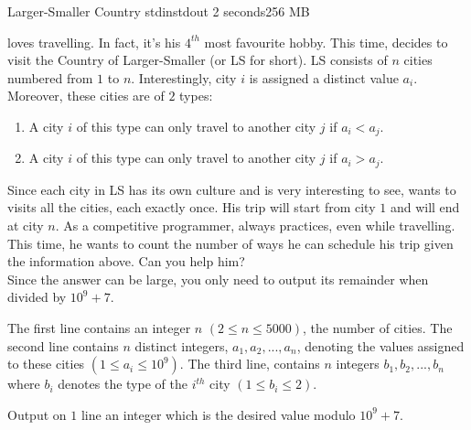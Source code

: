 \begin{problem}{Larger-Smaller Country}
{stdin}{stdout}
{2 seconds}{256 MB}{}

\TiChuot loves travelling. In fact, it's his $4^{th}$ most favourite hobby. This time, \TiChuot decides to visit the Country of Larger-Smaller (or
LS for short). LS consists of $n$ cities numbered from $1$ to $n$. Interestingly, city $i$ is assigned a distinct value $a_i$. Moreover, these cities
are of $2$ types:
    \begin{enumerate}
        \item
        A city $i$ of this type can only travel to another city $j$ if $a_i < a_j$.
        \item
        A city $i$ of this type can only travel to another city $j$ if $a_i > a_j$.
    \end{enumerate}
Since each city in LS has its own culture and is very interesting to see, \TiChuot wants to visits all the cities, each exactly once. His trip will
start from city $1$ and will end at city $n$. As a competitive programmer, \TiChuot always practices, even while travelling. This time, he wants to
count the number of ways he can schedule his trip given the information above. Can you help him?\\

Since the answer can be large, you only need to output its remainder when divided by $10^9 + 7$.

\InputFile
The first line contains an integer $n$ $(2 \leq n \leq 5000)$, the number of cities. The second line contains $n$ distinct integers, $a_1, a_2, ...,
a_n$, denoting the values assigned to these cities $(1 \leq a_i \leq 10^9)$. The third line, contains $n$ integers $b_1, b_2, ..., b_n$ where
$b_i$ denotes the type of the $i^{th}$ city $(1 \leq b_i \leq 2)$.

\OutputFile

Output on $1$ line an integer which is the desired value modulo $10^9 + 7$.

\Examples

\begin{example}
%
\end{example}

\end{problem}
